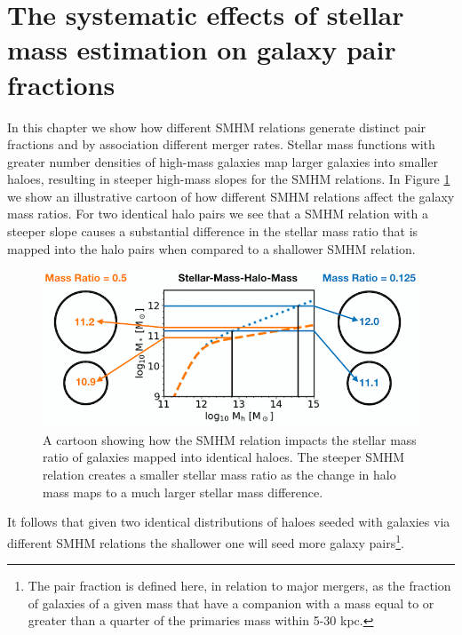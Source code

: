 \section{The systematic effects of stellar mass estimation on galaxy pair fractions}


In this chapter we show how different SMHM relations generate distinct pair fractions and by association different merger rates. 
Stellar mass functions with greater number densities of high-mass galaxies map larger galaxies into smaller haloes, resulting in steeper high-mass slopes for the SMHM relations.
In Figure \ref{fig:MassRatioCartoon} we show an illustrative cartoon of how different SMHM relations affect the galaxy mass ratios. 
For two identical halo pairs we see that a SMHM relation with a steeper slope causes a substantial difference in the stellar mass ratio that is mapped into the halo pairs when compared to a shallower SMHM relation. 

\begin{figure}[h]
	\centering
	\includegraphics[width = \linewidth]{Figures/Chapter5/MassRatioCartoon.png}
	\caption{A cartoon showing how the SMHM relation impacts the stellar mass ratio of galaxies mapped into identical haloes. The steeper SMHM relation creates a smaller stellar mass ratio as the change in halo mass maps to a much larger stellar mass difference.}
	\label{fig:MassRatioCartoon}
\end{figure}

It follows that given two identical distributions of haloes seeded with galaxies via different SMHM relations the shallower one will seed more galaxy pairs\footnote{The pair fraction is defined here, in relation to major mergers, as the fraction of galaxies of a given mass that have a companion with a mass equal to or greater than a quarter of the primaries mass within 5-30 kpc.}.

